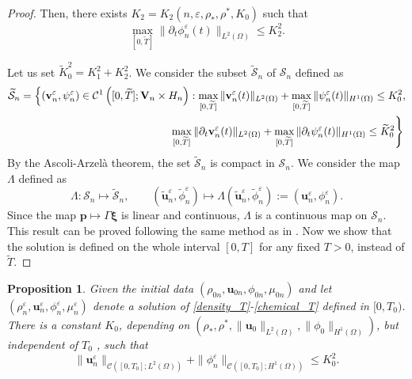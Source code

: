 \documentclass[11pt]{article}
\def\bq{\begin{equation}}
\def\eq{\end{equation}}
\def\bfv{\mathbf{v}}
\def\bfu{\mathbf{u}}
\def\bfp{\mathbf{p}}
\def\bfp{\mathbf{p}}
\def\bfxi{\boldsymbol{\xi}}
\def\bq{\begin{equation}}
\def\eq{\end{equation}}
\def\Ga{\Gamma}
\newtheorem{proposition}[theorem]{Proposition}
\begin{document}
\begin{proof}
Then, there exists $K_2=K_2\left(n,{\varepsilon}, \rho_*, \rho^*, K_0\right)$ such that
$$
\max _{[0,\widetilde{T}]}\|\partial_t \phi_n^{\varepsilon}(t)\|_{L^2(\Omega)} \leq K_2^2 .
$$

Let us set $\widetilde{K}_0^2=K_1^2+K_2^2$. We consider the subset $\widetilde{\mathcal{S}}_n$ of $\mathcal{S}_n$ defined as
$$
\begin{aligned}
&\widetilde{\mathcal{S}}_n=\left\{(\bfv_n^{\varepsilon}, \psi_n^{\varepsilon}) \in \mathcal{C}^1\left([0, \widetilde{T}] ; \mathbf{V}_n \times H_n\right):\right.  \max _{[0,\widetilde{T}]}\|\bfv_n^{\varepsilon}(t)\|_{L^2(\Omega)}+\max _{[0,\widetilde{T}]}\|\psi_n^{\varepsilon}(t)\|_{H^1(\Omega)} \leq K_0^2,\\
&\hspace{5.3cm}\left.\max_{[0,\widetilde{T}]}\|\partial_t \bfv_n^{\varepsilon}(t)\|_{L^2(\Omega)}+\max _{[0,\widetilde{T}]}\|\partial_t \psi_n^{\varepsilon}(t)\|_{H^1(\Omega)} \leq \widetilde{K}_0^2\right\}
\end{aligned}
$$
By the Ascoli-Arzelà theorem, the set $\widetilde{\mathcal{S}}_n$ is compact in $\mathcal{S}_n$. We consider the map $\Lambda$ defined as
$$
\Lambda : {\mathcal{S}}_n\longmapsto \widetilde{\mathcal{S}}_n,\qquad (\widetilde{\bfu}_n^{\varepsilon} , \widetilde{\phi}_n^{\varepsilon}) \longmapsto
\Lambda(\widetilde{\bfu}_n^{\varepsilon} , \widetilde{\phi}_n^{\varepsilon}) := (\bfu_n^{\varepsilon},\phi_n^{\varepsilon}). $$
Since the map $\bfp\longmapsto\Ga\bfxi$ is linear and continuous, $\Lambda$ is a continuous map on ${\mathcal{S}}_n$. This result can be proved following the same method as in \cite[see Appendix A]{giorgini2020weak}. Now we show that the solution is defined on the whole interval $[0,T]$ for any fixed $T>0$, instead of $\widetilde{T}$.
\end{proof}
\begin{proposition}\label{prop2}
Given the initial data $(\rho_{0n},\bfu_{0n},\phi_{0n},\mu_{0n})$ and let $(\rho_{n}^{\varepsilon},\bfu_{n}^{\varepsilon},\phi_{n}^{\varepsilon},\mu_{n}^{\varepsilon})$ denote a solution of \eqref{density_T}-\eqref{chemical_T} defined in $[0,T_0)$. There is a constant
$K_0$, depending on $(\rho_{*},\rho^{*},\|\bfu_{0}\|_{L^2(\Omega)},\|\phi_{0}\|_{H^1(\Omega)})$, but independent of $T_0$ , such that 
\bq
\|\bfu_{n}^{\varepsilon}\|_{\mathcal{C}([0,{T}_0];L^2(\Omega))} + \|\phi_{n}^{\varepsilon}\|_{\mathcal{C}([0,{T}_0];H^1(\Omega))}\leq K_0^2.
\eq
\end{proposition}
\end{document}
